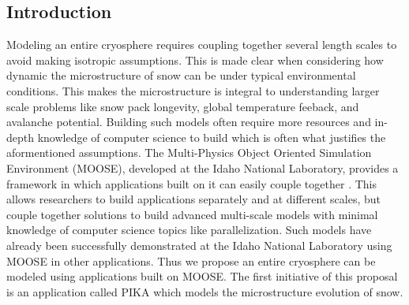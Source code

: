 \documentclass[twoside]{article}
\begin{document}
\begin{multicols}{2} %

\section{Introduction}

\lettrine[nindent=0em,lines=2]{M}odeling an entire cryosphere requires coupling together several length scales to avoid making isotropic assumptions. This is made clear when considering how dynamic the microstructure of snow can be under typical environmental conditions. This makes the microstructure is integral to understanding larger scale problems like snow pack longevity, global temperature feeback, and avalanche potential.  Building such models often require more resources and in-depth knowledge of computer science to build which is often what justifies the aformentioned assumptions. The Multi-Physics Object Oriented Simulation Environment (MOOSE), developed at the Idaho National Laboratory, provides a framework in which applications built on it can easily couple together  \cite{Gaston_2009}. This allows researchers to build applications separately and at different scales, but couple together solutions to build advanced multi-scale models with minimal knowledge of computer science topics like parallelization. Such models have already been successfully demonstrated at the Idaho National Laboratory using MOOSE in other applications. Thus we propose an entire cryosphere can be modeled using applications built on MOOSE. The first initiative of this proposal is an application called PIKA which models the microstructure evolution of snow.



\end{multicols}
\end{document}
